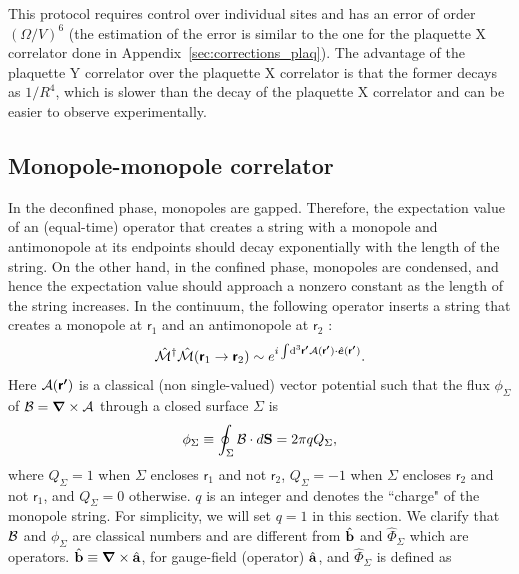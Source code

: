 \documentclass[twocolumn,superscriptaddress,amsmath,amssymb,aps,prx,nofootinbib]{revtex4-2}
\newcommand{\dual}[1]{\boldsymbol{\mathsf{#1}}}
\begin{document}
This protocol requires control over individual sites and has an error of order $(\Omega /V)^6$ (the estimation of the error is similar to the one for the plaquette X correlator done in Appendix~\ref{sec:corrections_plaq}). 
The advantage of the plaquette Y correlator over the plaquette X correlator is that the former decays as $1/R^4$, which is slower than the decay of the plaquette X correlator and can be easier to observe experimentally.





\subsection{Monopole-monopole correlator}\label{sec:monopole}
In the deconfined phase, monopoles are gapped. Therefore, the expectation value of an (equal-time) operator that creates a string with a monopole and antimonopole at its endpoints should decay exponentially with the length of the string. On the other hand, in the confined phase, monopoles are condensed, and hence the expectation value should approach a nonzero constant as the length of the string increases. In the continuum, the following operator inserts a string that creates a monopole at $\dual{r}_1$ and an antimonopole at $\dual{r}_2$ \cite{hermele2004}:
\begin{equation}\label{eq:monopolestring}
    \hat{\mathcal{M}}^\dagger \hat{\mathcal{M}} (\dual{r}_1 \rightarrow \dual{r}_2)\sim e^{i\int \dd[3]{\dual{r'}}\vb{\mathcal{A}}(\dual{r'})\cdot \hat{\boldsymbol{e}}(\dual{r'})}. 
\end{equation}
Here $\vb{\mathcal{A}}(\dual{r'})$ is a classical (non single-valued) vector potential such that the flux $\phi_{\Sigma}$ of $\vb{\mathcal{B}}=\grad \times \vb{\mathcal{A}}$ through a closed surface $\Sigma$ is 
\begin{equation}\label{eq:fluxcondition}
    \phi_{\Sigma}\equiv \oint_{\Sigma} \vb{\mathcal{B}}\cdot d\vb{S}=2\pi q Q_{\Sigma},
\end{equation}
where $Q_{\Sigma}=1$ when $\Sigma$ encloses $\dual{r}_1$ and not $\dual{r}_2$, $Q_{\Sigma}=-1$ when $\Sigma$ encloses $\dual{r}_2$ and not $\dual{r}_1$, and $Q_{\Sigma}=0$ otherwise. $q$ is an integer and denotes the ``charge" of the monopole string.  For simplicity, we will set $q=1$ in this section. We clarify that $\vb{\mathcal{B}}$ and $\phi_\Sigma$ are classical numbers and are different from $\hat{\vb{b}}$ and $\hat{\Phi}_{\Sigma}$ which are operators. $\hat{\vb{b}}\equiv \grad \times \hat{\vb{a}}$, for gauge-field (operator) $\hat{\vb{a}}$, and $\hat{\Phi}_{\Sigma}$ is defined as
\end{document}
